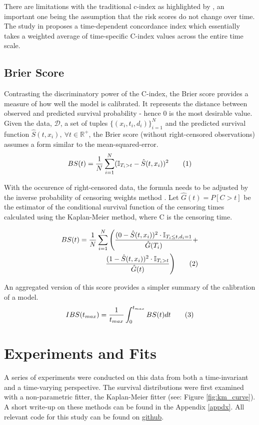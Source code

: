 \documentclass[%
 twocolumn,
 reprint,
 amsmath,amssymb,
 aps,nofootinbib
]{revtex4-2}
\newcommand\numberthis{\addtocounter{equation}{1}\tag{\theequation}} %
\begin{document}
There are limitations with the traditional c-index as highlighted by \cite{Hartman_Kim_He_Kalbfleisch_2023}, an important one being the assumption that the risk scores do not change over time. The study in \cite{Heagerty_Zheng_2005} proposes a time-dependent concordance index which essentially takes a weighted average of time-specific C-index values across the entire time scale.

\subsection{\label{ibs}Brier Score}

Contrasting the discriminatory power of the C-index, the Brier score provides a measure of how well the model is calibrated. It represents the distance between observed and predicted survival probability - hence 0 is the most desirable value. Given the data, $\mathcal{D}$, a set of tuples $\{(x_i , t_i , d_i)\}_{i=1}^{N}$ and the predicted survival function $\hat{S}(t, x_i),\ \forall t \in \mathbb{R^{+}}$, the Brier score (without right-censored observations) assumes a form similar to the mean-squared-error.
\[
BS(t) = \frac{1}{N}\sum^{N}_{i=1}(\mathbb{I}_{T_i>t}-\hat{S}(t, x_i))^2 \numberthis  \label{eq:bs}
\]

With the occurence of right-censored data, the formula needs to be adjusted by the inverse probability of censoring weights method \cite{graf_bs}. Let $\hat{G}(t) = P[C>t]$ be the estimator of the conditional survival function of the censoring times calculated using the Kaplan-Meier method, where C is the censoring time.

\begin{align*}
BS(t) = \frac{1}{N}\sum^{N}_{i=1}\Bigg(\frac{(0-\hat{S}(t,x_i))^2 \cdot \mathbb{I}_{T_i\le t, d_i = 1}}{\hat{G}(T_i)} +\\
\frac{(1-\hat{S}(t,x_i))^2 \cdot \mathbb{I}_{T_i > t}}{\hat{G}(t)} \Bigg) \numberthis  \label{eq:bs_ipcw}
\end{align*}

An aggregated version of this score provides a simpler summary of the calibration of a model.
\[
IBS(t_{max})= \frac{1}{t_{max}} \int^{t_{max}}_{0} BS(t) dt \numberthis  \label{eq:ibs}
\]

\section{\label{exp}Experiments and Fits}
A series of experiments  were conducted on this data from both a time-invariant and a time-varying perspective. The  survival distributions were first examined with a non-parametric fitter, the Kaplan-Meier fitter (see: Figure \ref{fig:km_curve}). A short write-up on these methods can be found in the Appendix \ref{appdx}. All relevant code for this study can be found on \href{https://github.com/sourasen1011/UoE_Research_Project_2023/tree/dev}{github}.\\
\end{document}
